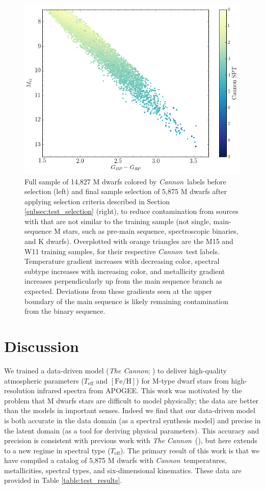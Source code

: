 \documentclass[twocolumn]{aastex62}
\newcommand{\thecannon}{\textsl{The Cannon}}
\newcommand{\cannon}{\textsl{Cannon}}
\newcommand{\teff}{T_{\mathrm{eff}}}
\newcommand{\feh}{[{\mathrm{Fe}/\mathrm{H}}]}
\begin{document}
\begin{figure}
\begin{center}
	\includegraphics[width=.47\linewidth]{cmd_spt_safe.png}
	\caption{Full sample of 14,827 M dwarfs colored by \cannon\ labels before selection (left) and final sample selection of 5,875 M dwarfs after applying selection criteria described in Section \ref{subsec:test_selection} (right), to reduce contamination from sources with that are not similar to the training sample (not single, main-sequence M stars, such as pre-main sequence, spectroscopic binaries, and K dwarfs). Overplotted with orange triangles are the M15 and W11 training samples, for their respective \cannon\ test labels. Temperature gradient increases with decreasing color, spectral subtype increases with increasing color, and metallicity gradient increases perpendicularly up from the main sequence branch as expected. Deviations from these gradients seen at the upper boundary of the main sequence is likely remaining contamination from the binary sequence.}
	\label{fig:safe_selection}
\end{center}
\end{figure}

\section{Discussion} \label{sec:discussion}

We trained a data-driven model (\thecannon; \citealt{Ness:2015}) to deliver
high-quality atmospheric parameters ($\teff$ and $\feh$) for M-type dwarf stars
from high-resolution infrared spectra from APOGEE.
This work was motivated by the problem that M dwarfs stars are difficult to
model physically; the data are better than the models in important senses.
Indeed we find that our data-driven model is both accurate in the
data domain (as a spectral synthesis model) and precise in the latent domain
(as a tool for deriving physical parameters).
This accuracy and precision is consistent with previous work with
\thecannon\ (\citealt{Ness:2015, Casey:2016, Ho:2017a, Ness:2018}), but
here extends to a new regime in spectral type ($\teff$).
The primary result of this work is that
we have compiled a catalog of 5,875 M dwarfs with \cannon\ temperatures,
metallicities, spectral types, and six-dimensional kinematics.
These data are provided in Table \ref{table:test_results}.
\end{document}
